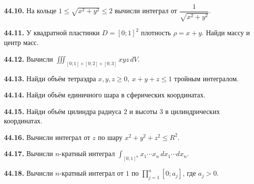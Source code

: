 \noindent\begin{minipage}[t]{\linewidth}\textbf{44.10.} На кольце \(1\le\sqrt{x^2+y^2}\le2\) вычисли интеграл от \(\dfrac1{\sqrt{x^2+y^2}}\).\par\end{minipage}\par
\noindent\begin{minipage}[t]{\linewidth}\textbf{44.11.} У квадратной пластинки \(D=[0;1]^2\) плотность \(\rho=x+y\). Найди массу и центр масс.\par\end{minipage}\par
\noindent\begin{minipage}[t]{\linewidth}\textbf{44.12.} Вычисли \(\iiint_{[0;1]\times[0;2]\times[0;3]}xyz\,dV\).\par\end{minipage}\par
\noindent\begin{minipage}[t]{\linewidth}\textbf{44.13.} Найди объём тетраэдра \(x,y,z\ge0,\ x+y+z\le1\) тройным интегралом.\par\end{minipage}\par
\noindent\begin{minipage}[t]{\linewidth}\textbf{44.14.} Найди объём единичного шара в сферических координатах.\par\end{minipage}\par
\noindent\begin{minipage}[t]{\linewidth}\textbf{44.15.} Найди объём цилиндра радиуса \(2\) и высоты \(3\) в цилиндрических координатах.\par\end{minipage}\par
\noindent\begin{minipage}[t]{\linewidth}\textbf{44.16.} Вычисли интеграл от \(z\) по шару \(x^2+y^2+z^2\le R^2\).\par\end{minipage}\par
\noindent\begin{minipage}[t]{\linewidth}\textbf{44.17.} Вычисли \(n\)-кратный интеграл \(\int_{[0;1]^n}x_1\cdots x_n\,dx_1\cdots dx_n\).\par\end{minipage}\par
\noindent\begin{minipage}[t]{\linewidth}\textbf{44.18.} Вычисли \(n\)-кратный интеграл от \(1\) по \(\prod_{j=1}^n[0;a_j]\), где \(a_j>0\).\par\end{minipage}\par
